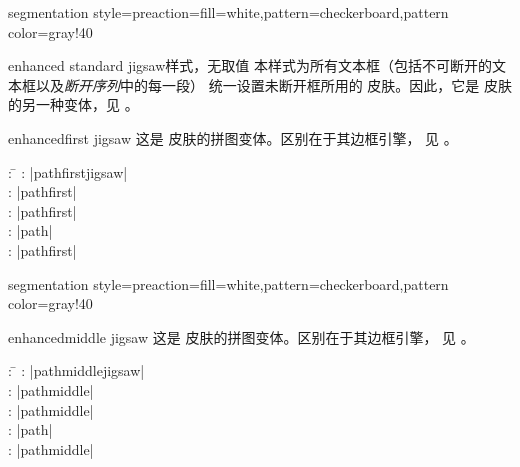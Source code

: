 \begin{dispExample*}{segmentation style={preaction={fill=white},pattern=checkerboard,pattern color=gray!40}}
\end{dispExample*}


\begin{docTcbKey}[][doc new=2017-07-01]{enhanced standard jigsaw}{}{样式，无取值}
  本样式为所有文本框（包括不可断开的文本框以及\emph{断开序列}中的每一段）
  统一设置未断开框所用的  皮肤。因此，它是
   皮肤的另一种变体，见 。
\end{docTcbKey}


\clearpage
\begin{docSkin}{enhancedfirst jigsaw}
  这是  皮肤的拼图变体。区别在于其边框引擎，
  见 。
\begin{tcolorbox}[skintable=enhancedfirst jigsaw]
  \begin{tabbing}
    : \=\kill
    :           \> |pathfirstjigsaw|\\
    : \> |pathfirst|\\ 
    :        \> |pathfirst|\\
    :    \> |path|\\
    :           \> |pathfirst|
  \end{tabbing}
\end{tcolorbox}
\end{docSkin}


\begin{dispExample*}{segmentation style={preaction={fill=white},pattern=checkerboard,pattern color=gray!40}}
\end{dispExample*}


\clearpage
\begin{docSkin}{enhancedmiddle jigsaw}
  这是  皮肤的拼图变体。区别在于其边框引擎，
  见 。
\begin{tcolorbox}[skintable=enhancedmiddle jigsaw]
  \begin{tabbing}
    : \=\kill
    :           \> |pathmiddlejigsaw|\\
    : \> |pathmiddle|\\ 
    :        \> |pathmiddle|\\
    :    \> |path|\\
    :           \> |pathmiddle|
  \end{tabbing}
\end{tcolorbox}
\end{docSkin}



